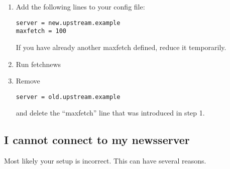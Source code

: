 \documentclass[10pt,english,a5paper]{article}
\begin{document}
    \begin{enumerate}
	\item Add the following lines to your config file:

	    \begin{verbatim}
server = new.upstream.example
maxfetch = 100
\end{verbatim}
       If you have already another maxfetch defined, reduce it
       temporarily.
   \item Run fetchnews
   \item Remove
       \begin{verbatim}
server = old.upstream.example
\end{verbatim}
       and delete the ``maxfetch'' line that was introduced in step 1.
       \end{enumerate}

       \subsection{I cannot connect to my newsserver}

    Most likely your setup is incorrect. This can have several reasons.
\end{document}
